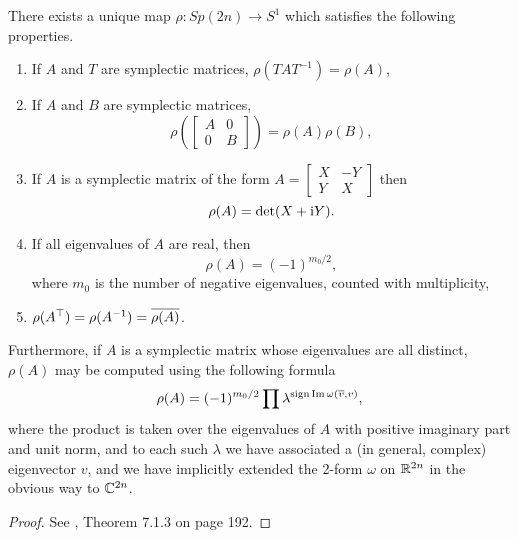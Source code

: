\begin{theorem}\label{rhodef}
There exists a unique map $\rho \colon Sp(2n) \to S^1$ which satisfies the following properties.
\begin{enumerate}[label=\roman*)]
\item If $A$ and $T$ are symplectic matrices, $\rho(T A T^{-1}) = \rho(A)$,
\item If $A$ and $B$ are symplectic matrices,
\begin{equation}
\rho\left(\begin{bmatrix} A & 0 \\ 0 & B \end{bmatrix}\right) = \rho(A) \rho(B),
\end{equation}
\item\label{rhodef:xy} If $A$ is a symplectic matrix of the form $A = \begin{bmatrix} X & -Y \\ Y & X \end{bmatrix}$ then
\begin{equation}
\rho(A) = \det(X + \mathrm{i} Y).
\end{equation}
\item\label{rhodef:realev} If all eigenvalues of $A$ are real, then
\begin{equation}
\rho(A) = (-1)^{m_0/2},
\end{equation}
where $m_0$ is the number of negative eigenvalues, counted with multiplicity,
\item $\rho(A^\top) = \rho(A^{-1}) = \overline{\rho(A)}$.
\end{enumerate}

Furthermore, if $A$ is a symplectic matrix whose eigenvalues are all distinct, $\rho(A)$ may be computed using the following formula
\begin{equation}\label{rhoformula}
\rho(A) = (-1)^{m_0/2} \prod \lambda^{\operatorname{sign} \operatorname{Im} \omega(\overline{v}, v)},
\end{equation}
where the product is taken over the eigenvalues of $A$ with positive imaginary part and unit norm, and to each such $\lambda$ we have associated  a (in general, complex) eigenvector $v$, and we have implicitly extended the 2-form $\omega$ on $\mathbb{R}^{2n}$ in the obvious way to $\mathbb{C}^{2n}$.
\end{theorem}

\begin{proof}
See \cite{audin}, Theorem 7.1.3 on page 192.
\end{proof}


